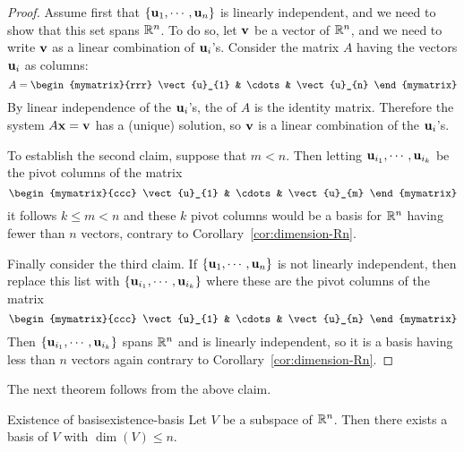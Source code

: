 \begin{proof}
Assume first that $\left\{\mbox{\bf u}_{1},\cdots ,\mbox{\bf u}_{n}\right\} $
is linearly independent, and we need to show that this set spans
$\mathbb{R}^{n}$. To do so, let $\mbox{\bf v}$ be a vector of
$\mathbb{R}^{n}$, and we need to write $\mbox{\bf v}$ as a linear combination of $\mbox{\bf u}_i$'s. 
Consider the matrix $A$ having the vectors $\mbox{\bf u}_i$  as
columns:
\begin{equation*}
A = 
\begin{mymatrix}{rrr}
\vect{u}_{1} & \cdots & \vect{u}_{n} 
\end{mymatrix}
\end{equation*}
By linear independence of the $\mbox{\bf u}_i$'s, the {\rref} of $A$ is
the identity matrix.  Therefore the system $A\mbox{\bf x}=
\mbox{\bf v}$ has a (unique) solution, so $\mbox{\bf v}$ is a linear combination
of the $\mbox{\bf u}_i$'s.

To establish the second claim, suppose that $m<n$. Then letting
$\mbox{\bf u}_{i_{1}},\cdots ,\mbox{\bf u}_{i_{k}}$ be the pivot columns of the
matrix
\begin{equation*}
\begin{mymatrix}{ccc}
\vect{u}_{1} & \cdots & \vect{u}_{m}
\end{mymatrix}
\end{equation*}
it follows $k\leq m<n$ and these $k$ pivot columns would be a basis
for $\mathbb{R}^{n}$ having fewer than $n$ vectors, contrary to
Corollary~\ref{cor:dimension-Rn}.

Finally consider the third claim. If $\left\{\mbox{\bf u}_{1},\cdots
,\mbox{\bf u}_{n}\right\} $ is not linearly independent, then replace this
list with $\left\{\mbox{\bf u}_{i_{1}},\cdots ,\mbox{\bf u}_{i_{k}}\right\} $ where these
are the pivot columns of the matrix 
\begin{equation*}
\begin{mymatrix}{ccc}
\vect{u}_{1} & \cdots & \vect{u}_{n}
\end{mymatrix}
\end{equation*}
Then $\left\{\mbox{\bf u}_{i_{1}},\cdots ,\mbox{\bf u}_{i_{k}}\right\} $ spans
$\mathbb{R}^{n}$ and is linearly independent, so it is a basis having
less than $n$ vectors again contrary to Corollary~\ref{cor:dimension-Rn}.
\end{proof}

The next theorem follows from the above claim.

\begin{theorem}{Existence of basis}{existence-basis}
Let $V$ be a subspace of $\mathbb{R}^n$. Then there exists a basis of $V$ with 
 $\dim(V)\leq n$.
\end{theorem}

